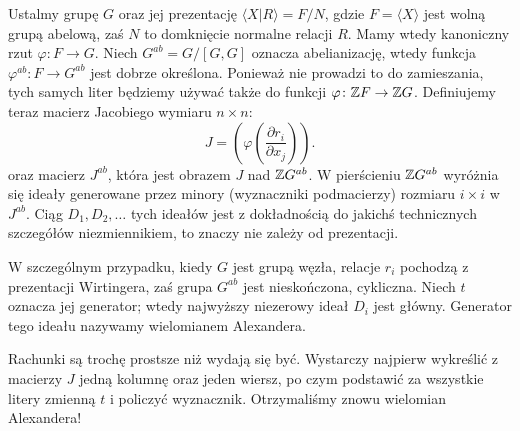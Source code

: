 Ustalmy grupę $G$ oraz jej prezentację $\langle X | R \rangle = F/N$, gdzie $F = \langle X \rangle$ jest wolną grupą abelową, zaś $N$ to domknięcie normalne relacji $R$.
Mamy wtedy kanoniczny rzut $\varphi \colon F \to G$.
Niech $G^{ab} = G/[G, G]$ oznacza abelianizację, wtedy funkcja $\varphi^{ab} \colon F \to G^{ab}$ jest dobrze określona.
Ponieważ nie prowadzi to do zamieszania, tych samych liter będziemy używać także do funkcji $\varphi \colon \mathbb Z F \to \mathbb Z G$.
Definiujemy teraz macierz Jacobiego wymiaru $n \times n$:
%
\begin{equation}
    J = \left(\varphi \left(\frac{\partial r_i}{\partial x_j}\right) \right).
\end{equation}
oraz macierz $J^{ab}$, która jest obrazem $J$ nad $\mathbb Z G^{ab}$.
W pierścieniu $\mathbb Z G^{ab}$ wyróżnia się ideały generowane przez minory (wyznaczniki podmacierzy) rozmiaru $i \times i$ w $J^{ab}$.
Ciąg $D_1, D_2, \ldots$ tych ideałów jest z dokładnością do jakichś technicznych szczegółów niezmiennikiem, to znaczy nie zależy od prezentacji.

W szczególnym przypadku, kiedy $G$ jest grupą węzła, relacje $r_i$ pochodzą z prezentacji Wirtingera, zaś grupa $G^{ab}$ jest nieskończona, cykliczna.
Niech $t$ oznacza jej generator; wtedy najwyższy niezerowy ideał $D_i$ jest główny.
Generator tego ideału nazywamy wielomianem Alexandera.
%

Rachunki są trochę prostsze niż wydają się być.
Wystarczy najpierw wykreślić z macierzy $J$ jedną kolumnę oraz jeden wiersz, po czym podstawić za wszystkie litery zmienną $t$ i policzyć wyznacznik.
Otrzymaliśmy znowu wielomian Alexandera!

%

